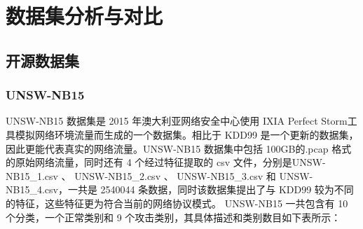 
\chapter{数据集分析与对比}
\section{开源数据集}
\subsection{UNSW-NB15}
UNSW-NB15 数据集是 2015 年澳大利亚网络安全中心使用 IXIA Perfect Storm工具模拟网络环境流量而生成的一个数据集。相比于 KDD99 是一个更新的数据集，因此更能代表真实的网络流量。UNSW-NB15 数据集中包括 100GB的.pcap 格式的原始网络流量，同时还有 4 个经过特征提取的 csv 文件，分别是UNSW-NB15\_1.csv  、 UNSW-NB15\_2.csv 、 UNSW-NB15\_3.csv  和   UNSW-NB15\_4.csv，一共是 2540044 条数据，同时该数据集提出了与 KDD99 较为不同的特征，这些特征更为符合当前的网络协议模式。 UNSW-NB15 一共包含有 10 个分类，一个正常类别和 9 个攻击类别，其具体描述和类别数目如下表所示： 

